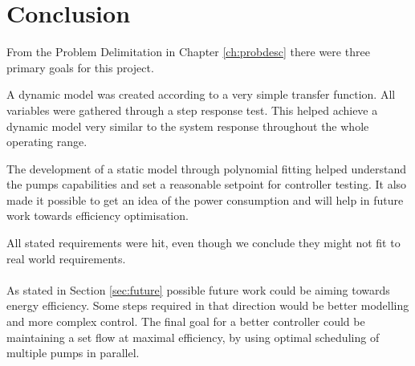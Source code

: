 \chapter{Conclusion}\label{ch:conclusion}
From the Problem Delimitation in Chapter \ref{ch:probdesc} there were three primary goals for this project.

A dynamic model was created according to a very simple transfer function.
All variables were gathered through a step response test.
This helped achieve a dynamic model very similar to the system response throughout the whole operating range.

The development of a static model through polynomial fitting helped understand the pumps capabilities and set a reasonable setpoint for controller testing.
It also made it possible to get an idea of the power consumption and will help in future work towards efficiency optimisation.

All stated requirements were hit,
even though we conclude they might not fit to real world requirements.
\\
\\
As stated in Section \ref{sec:future} possible future work could be aiming towards energy efficiency.
Some steps required in that direction would be better modelling and more complex control.
The final goal for a better controller could be maintaining a set flow at maximal efficiency,
by using optimal scheduling of multiple pumps in parallel.

